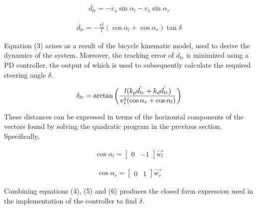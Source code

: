 \documentclass[conference]{IEEEtran}
\begin{document}
\begin{equation}
    \begin{aligned}
        \dot{d_{lr}} = -v_s \sin \alpha_l - v_s \sin \alpha_r
    \end{aligned}
\end{equation}  

\begin{equation}
    \begin{aligned}
        \ddot{d_{lr}} = -\frac{v_s^2}{l} (\cos \alpha_l + \cos \alpha_r)\tan \delta 
    \end{aligned}
\end{equation}

Equation (3) arises as a result of the bicycle kinematic model, used to derive the dynamics of the system. Moreover, the tracking error of $d_{lr}$ is minimized using a PD controller, the output of which is used to subsequently calculate the required steering angle $\delta$. 

\begin{equation}
        \delta_{lr} = \arctan \left( \frac{l ( k_p \Tilde{d_{lr}} +k_d \dot{d_{lr}} )}{v_s^2(\cos \alpha_{r} + \cos \alpha_{l} )} \right) 
\end{equation}




These distances can be expressed in terms of the horizontal components of the vectors found by solving the quadratic program in the previous section. Specifically, 


\begin{equation}
    \begin{aligned}
        \cos \alpha_l = \begin{bmatrix}
            0 & -1
        \end{bmatrix} \Vec{w_l} 
    \end{aligned}
\end{equation}

\begin{equation}
    \begin{aligned}
         \cos \alpha_r = \begin{bmatrix}
            0 & 1
        \end{bmatrix} \Vec{w_r}
    \end{aligned}
\end{equation}


Combining equations (4), (5) and (6) produces the closed form expression used in the implementation of the controller to find $\delta$.
\end{document}
